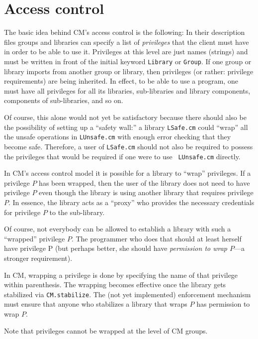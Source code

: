 \documentclass{article}
\begin{document}
\section{Access control}
\label{sec:access}

The basic idea behind CM's access control is the following: In their
description files groups and libraries can specify a list of
{\em privileges} that the client must have in order to be able to use it.
Privileges at this level are just names (strings) and must be written
in front of the initial keyword {\tt Library} or {\tt Group}.  If one
group or library imports from another group or library, then
privileges (or rather: privilege requirements) are being inherited.
In effect, to be able to use a program, one must have all privileges
for all its libraries, sub-libraries and library components,
components of sub-libraries, and so on.

Of course, this alone would not yet be satisfactory because there
should also be the possibility of setting up a ``safety wall:'' a
library {\tt LSafe.cm} could ``wrap'' all the unsafe operations in
{\tt LUnsafe.cm} with enough error checking that they become safe.
Therefore, a user of {\tt LSafe.cm} should not also be required to
possess the privileges that would be required if one were to use {\tt
LUnsafe.cm} directly.

In CM's access control model it is possible for a library to ``wrap''
privileges.  If a privilege $P$ has been wrapped, then the user of the
library does not need to have privilege $P$ even though the library is
using another library that requires privilege $P$.  In essence, the
library acts as a ``proxy'' who provides the necessary credentials for
privilege $P$ to the sub-library.

Of course, not everybody can be allowed to establish a library with
such a ``wrapped'' privilege $P$.  The programmer who does that should at
least herself have privilege P (but perhaps better, she should have
{\em permission to wrap $P$}---a stronger requirement).

In CM, wrapping a privilege is done by specifying the name of that
privilege within parenthesis.  The wrapping becomes effective once the
library gets stabilized via {\tt CM.stabilize}.  The (not yet
implemented) enforcement mechanism must ensure that anyone who
stabilizes a library that wraps $P$ has permission to wrap $P$.

Note that privileges cannot be wrapped at the level of CM groups.
\end{document}
